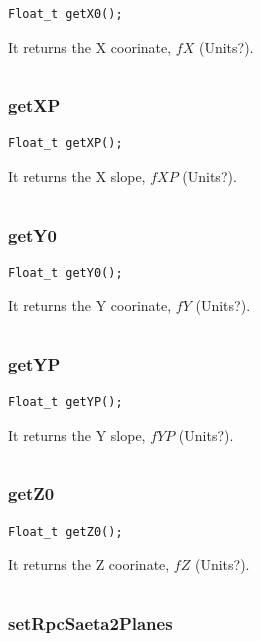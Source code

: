 \documentclass[a4paper]{book}
\begin{document}
\begin{lstlisting}
Float_t getX0();
\end{lstlisting}

It returns the X coorinate, $fX$ (Units?).

\[\]

\subsubsection{getXP}

\begin{lstlisting}
Float_t getXP();
\end{lstlisting}

It returns the X slope, $fXP$ (Units?).

\[\]

\subsubsection{getY0}

\begin{lstlisting}
Float_t getY0();
\end{lstlisting}

It returns the Y coorinate, $fY$ (Units?).

\[\]

\subsubsection{getYP}

\begin{lstlisting}
Float_t getYP();
\end{lstlisting}

It returns the Y slope, $fYP$ (Units?).

\[\]

\subsubsection{getZ0}

\begin{lstlisting}
Float_t getZ0();
\end{lstlisting}

It returns the Z coorinate, $fZ$ (Units?).

\[\]

\subsubsection{setRpcSaeta2Planes}
\end{document}
